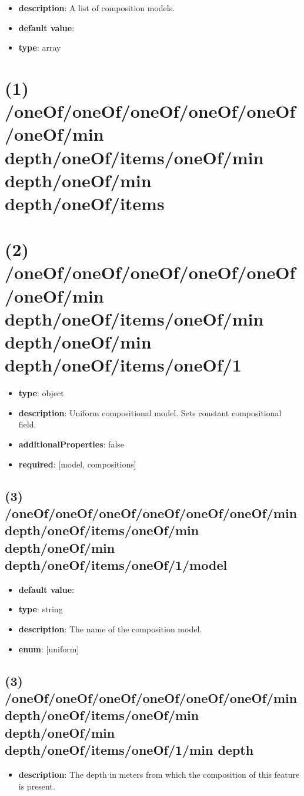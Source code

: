 \begin{itemize}[leftmargin=0em]\item {\bf description}: A list of composition models.
\item {\bf default value}: 
\item {\bf type}: array
\end{itemize}\section{(1) /oneOf/oneOf/oneOf/oneOf/oneOf/oneOf/min depth/oneOf/items/oneOf/min depth/oneOf/min depth/oneOf/items}

\section{(2) /oneOf/oneOf/oneOf/oneOf/oneOf/oneOf/min depth/oneOf/items/oneOf/min depth/oneOf/min depth/oneOf/items/oneOf/1}
\begin{itemize}[leftmargin=2em]\item {\bf type}: object
\item {\bf description}: Uniform compositional model. Sets constant compositional field.
\item {\bf additionalProperties}: false
\item {\bf required}: [model, compositions]\end{itemize}
\subsection{(3) /oneOf/oneOf/oneOf/oneOf/oneOf/oneOf/min depth/oneOf/items/oneOf/min depth/oneOf/min depth/oneOf/items/oneOf/1/model}
\begin{itemize}[leftmargin=3em]\item {\bf default value}: 
\item {\bf type}: string
\item {\bf description}: The name of the composition model.
\item {\bf enum}: [uniform]\end{itemize}\subsection{(3) /oneOf/oneOf/oneOf/oneOf/oneOf/oneOf/min depth/oneOf/items/oneOf/min depth/oneOf/min depth/oneOf/items/oneOf/1/min depth}
\begin{itemize}[leftmargin=3em]\item {\bf description}: The depth in meters from which the composition of this feature is present.
\end{itemize}
